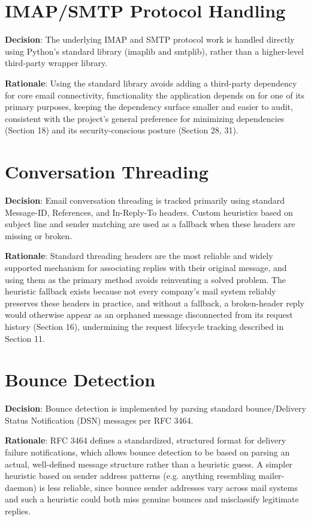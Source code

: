 \section{IMAP/SMTP Protocol Handling}
\textbf{Decision}: The underlying IMAP and SMTP protocol work is handled directly using Python's standard library (imaplib and smtplib), rather than a higher-level third-party wrapper library.

\textbf{Rationale}: Using the standard library avoids adding a third-party dependency for core email connectivity, functionality the application depends on for one of its primary purposes, keeping the dependency surface smaller and easier to audit, consistent with the project's general preference for minimizing dependencies (Section 18) and its security-conscious posture (Section 28, 31).
\section{Conversation Threading}
\textbf{Decision}: Email conversation threading is tracked primarily using standard Message-ID, References, and In-Reply-To headers. Custom heuristics based on subject line and sender matching are used as a fallback when these headers are missing or broken.

\textbf{Rationale}: Standard threading headers are the most reliable and widely supported mechanism for associating replies with their original message, and using them as the primary method avoids reinventing a solved problem. The heuristic fallback exists because not every company's mail system reliably preserves these headers in practice, and without a fallback, a broken-header reply would otherwise appear as an orphaned message disconnected from its request history (Section 16), undermining the request lifecycle tracking described in Section 11.
\section{Bounce Detection}
\textbf{Decision}: Bounce detection is implemented by parsing standard bounce/Delivery Status Notification (DSN) messages per RFC 3464.

\textbf{Rationale}: RFC 3464 defines a standardized, structured format for delivery failure notifications, which allows bounce detection to be based on parsing an actual, well-defined message structure rather than a heuristic guess. A simpler heuristic based on sender address patterns (e.g. anything resembling mailer-daemon) is less reliable, since bounce sender addresses vary across mail systems and such a heuristic could both miss genuine bounces and misclassify legitimate replies.

\sentinelchapterend